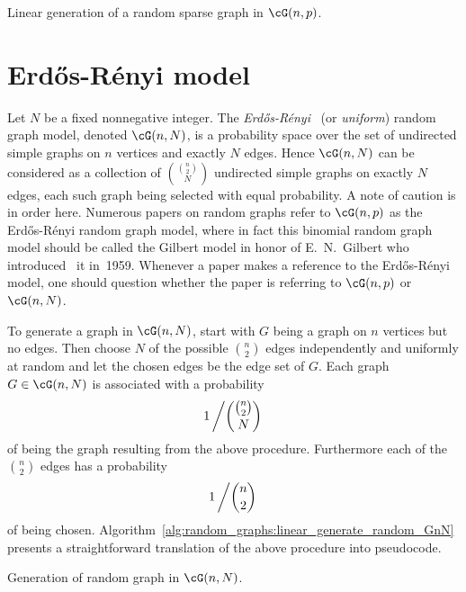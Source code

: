 \begin{algorithm}[!htbp]

\caption{Linear generation of a random sparse graph in $\cG(n,p)$.}
\label{alg:random_graphs:linear_generate_random_sparse_Gnp}
\end{algorithm}



\section{Erd\H{o}s-R\'enyi model}
\label{sec:random_graphs:Erdos_Renyi_model}

Let $N$ be a fixed nonnegative integer. The
\emph{Erd\H{o}s-R\'enyi}~\cite{ErdosRenyi1959,ErdosRenyi1960}
(or
\emph{uniform}) random graph model,
denoted $\cG(n,N)$, is a probability space over the set of undirected
simple graphs on $n$ vertices and exactly $N$ edges. Hence $\cG(n,N)$
can be considered as a collection of $\binom{\binom{n}{2}} {N}$
undirected simple graphs on exactly $N$ edges, each such graph being
selected with equal probability. A note of caution is in order
here. Numerous papers on random graphs refer to $\cG(n,p)$ as the
Erd\H{o}s-R\'enyi random graph model, where in fact this binomial
random graph model should be called the Gilbert model in honor of
E.~N.~Gilbert who introduced~\cite{Gilbert1959}
it in~1959. Whenever a paper makes a reference to the
Erd\H{o}s-R\'enyi model, one should question whether the paper is
referring to $\cG(n,p)$ or $\cG(n,N)$.

To generate a graph in $\cG(n,N)$, start with $G$ being a graph on $n$
vertices but no edges. Then choose $N$ of the possible $\binom{n}{2}$
edges independently and uniformly at random and let the chosen edges
be the edge set of $G$. Each graph $G \in \cG(n,N)$ is associated with a
probability
\[
1 \left/ \binom{\binom{n}{2}} {N} \right.
\]
of being the graph resulting from the above procedure. Furthermore
each of the $\binom{n}{2}$ edges has a probability
\[
1 \left/ \binom{n}{2} \right.
\]
of being chosen.
Algorithm~\ref{alg:random_graphs:linear_generate_random_GnN} presents
a straightforward translation of the above procedure into pseudocode.

\begin{algorithm}[!htbp]

\caption{Generation of random graph in $\cG(n,N)$.}
\label{alg:random_graphs:linear_generate_random_GnN}
\end{algorithm}

